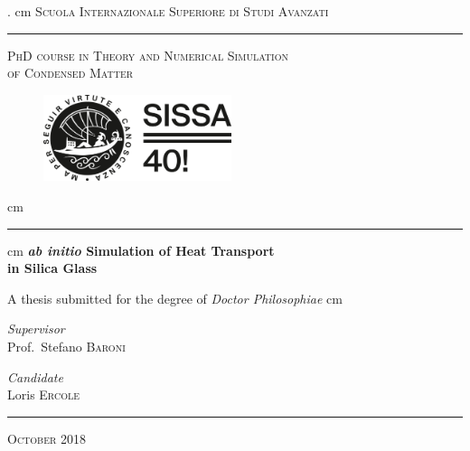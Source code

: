 \begin{titlepage}
\begin{center}

  . cm
\textsc{\Large Scuola Internazionale Superiore di Studi Avanzati} %
\vskip 0.75cm
\hrule height 1 pt
\vskip 0.75cm
\textsc{\fontsize{14}{16}\selectfont PhD course in Theory and Numerical Simulation\\
of Condensed Matter}
\vskip 0.5cm

 \begin{figure}[h]
 \centering
 \includegraphics[width=5.5cm]{frontmatter/SISSA_40_alt.png}
 \end{figure}

 cm
\hrule height 1 pt
 cm
{ \fontsize{20}{22} \bfseries  \emph{ab initio} Simulation of Heat Transport \\
\vspace{0.4cm}
in Silica Glass
}
\vfill

{A thesis submitted for the degree of \textit{Doctor Philosophiae}}
 cm

\begin{center}
\begin{minipage}{0.3\textwidth}
\fontsize{12}{14}\selectfont
\emph{Supervisor}\\
\smallskip
Prof.~Stefano \textsc{Baroni}
\end{minipage}
\hspace{2cm}
\begin{minipage}{0.3\textwidth}
\fontsize{12}{14}\selectfont
\emph{Candidate}\\
\smallskip
Loris \textsc{Ercole}
\end{minipage}
\end{center}
\vspace{1cm}



\hrule height 1.1 pt
\vskip 0.5cm

\textsc{\large October 2018}

\end{center}

\end{titlepage} 